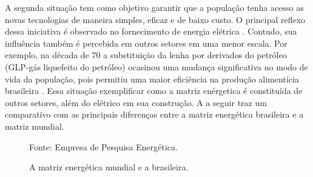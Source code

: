A segunda situa\c c\~ao tem como objetivo
garantir que a popula\c c\~ao tenha acesso as novas tecnologias de maneira
simples, eficaz e de baixo custo. O principal reflexo dessa iniciativa \'e observado no fornecimento de energia
el\'etrica \cite{an}. Contudo, sua influ\^encia tamb\'em \'e percebida em outros setores em uma menor escala. Por
exemplo, na d\'ecada de 70 a substitui\c c\~ao da lenha por derivados do petr\'oleo (GLP-g\'as liquefeito do
petr\'oleo) ocasinou uma mudan\c ca significativa no modo de vida da popula\c c\~ao, pois permitiu uma maior efici\^encia na
produ\c c\~ao aliment\'icia brasileira \cite{an}. Essa situa\c c\~ao exemplificar como a matriz en\'ergetica \'e
constitu\'ida de outros setores,
al\'em do el\'etrico em sua constru\c c\~ao. A  a seguir traz um comparativo com as principais diferen\c cas entre a matriz
energ\'etica brasileira e a matriz mundial.
\begin{figure}[!h]
	\centering
	\quad \quad
	\caption[A matriz energ\'etica mundial e a brasileira.]{A matriz energ\'etica mundial e a brasileira.}{Fonte: Empresa de Pesquisa Energ\'etica.}
	\label{comparation}
\end{figure}

